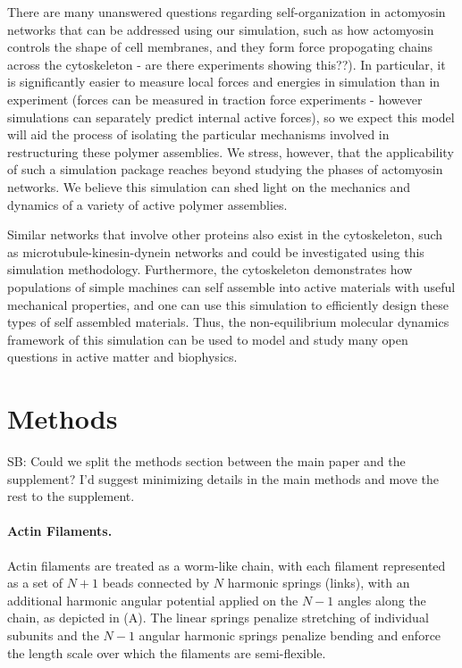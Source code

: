 \documentclass[11pt]{article}
\begin{document}
\par 
There are many unanswered questions regarding {\color{red}self-organization in} actomyosin networks that {\color{red}can be}
addressed using {\color{red}our} simulation, such as how {\color{red}actomyosin} controls the shape of cell membranes, {\color{blue}and they form force
propogating chains across the cytoskeleton - are there experiments showing this??)}. 
In particular, it is significantly easier to measure local forces and energies in simulation than in experiment ({\color{blue}forces can be measured in traction force experiments - however simulations can separately predict internal active forces}), 
so we expect this model will aid the process of isolating the particular mechanisms involved in restructuring these
polymer assemblies. We stress, however, that
the applicability of such a simulation package reaches beyond studying the phases of actomyosin networks.  
We believe this simulation can shed light on {\color{red}the mechanics and dynamics of} a variety of active polymer assemblies.
\par
Similar networks that involve other proteins also exist in the
cytoskeleton, such as microtubule-kinesin-dynein networks and could be investigated using this simulation methodology. 
Furthermore, the cytoskeleton demonstrates how populations of simple machines can self assemble into active materials with
useful mechanical properties, and one can use this simulation to efficiently design these types of self assembled
materials. Thus, the non-equilibrium molecular dynamics framework of this simulation can be used to model and study
many open questions in active matter and biophysics.

\section*{Methods}  
{\color{blue}SB: Could we split the methods section between the main paper and the supplement? I'd suggest minimizing details in the main methods and move the rest to the supplement.}
\paragraph{{\bf Actin Filaments.}} Actin filaments are treated as a worm-like chain, with each filament represented as a set of $N+1$ beads connected by $N$ harmonic springs (links), with an additional harmonic angular potential applied on the $N-1$ angles along the chain, as depicted in (A). The linear springs 
penalize stretching of individual subunits and the $N-1$ angular harmonic springs penalize bending and enforce the length scale over which the filaments are semi-flexible. 
\end{document}
